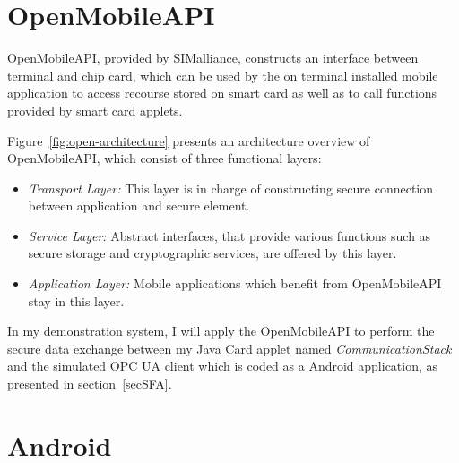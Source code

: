 \section{OpenMobileAPI} \label{secOMA}
OpenMobileAPI, provided by SIMalliance, constructs an interface between terminal and chip card, which can be used by the on terminal installed mobile application to access recourse stored on smart card as well as to call functions provided by smart card applets.  

Figure~\ref{fig:open-architecture} presents an architecture overview of OpenMobileAPI, which consist of three functional layers:

 \begin{itemize}
  \item \emph{Transport Layer:} This layer is in charge of constructing  secure connection between application and secure element.
  \item \emph{Service Layer:} Abstract interfaces, that provide various functions such as secure storage and cryptographic services, are offered by this layer.
  \item \emph{Application Layer:} Mobile applications which benefit from OpenMobileAPI stay in this layer.
\end{itemize}

In my demonstration system, I will apply the OpenMobileAPI to perform the secure data exchange between my Java Card applet named \emph{CommunicationStack} and the simulated OPC UA client which is coded as a Android application, as presented in section~\ref{secSFA}.

\section{Android} \label{secAndroid}
